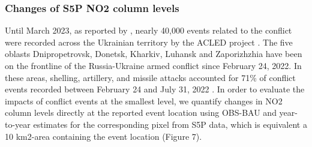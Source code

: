 \subsubsection*{Changes of S5P NO2 column levels}
Until March 2023, as reported by \citep{nichita2023}, nearly 40,000 events related to the conflict were recorded across the Ukrainian territory by the ACLED project \citep{raleigh2010introducing}. The five oblasts Dnipropetrovsk, Donetsk, Kharkiv, Luhansk and Zaporizhzhia have been on the frontline of the Russia-Ukraine armed conflict since February 24, 2022. In these areas, shelling, artillery, and missile attacks accounted for 71\% of conflict events recorded between February 24 and July 31, 2022 \citep{nichita2023}. In order to evaluate the impacts of conflict events at the smallest level, we quantify changes in NO2 column levels directly at the reported event location using OBS-BAU and year-to-year estimates for the corresponding pixel from S5P data, which is equivalent a 10 km2-area containing the event location (Figure 7). \par

